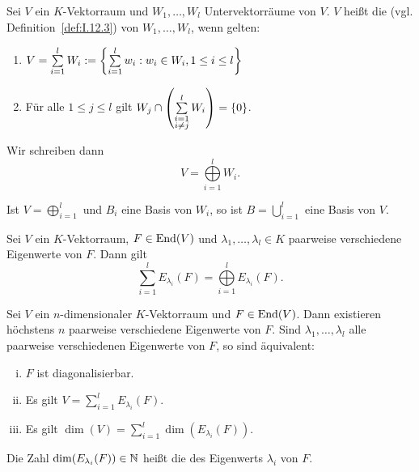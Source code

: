 \begin{definition}
	\label{def:I.16.17}
	Sei $V$ ein $K$-Vektorraum und $W_1,\dots,W_l$ Untervektorräume von $V$.
	$V$ heißt die  (vgl. Definition~\ref{def:I.12.3}) von $W_1,\dots,W_l$, wenn gelten:
	\begin{enumerate}[(1)]
		\item $V = \sum\limits_{i=1}^{l} W_i := \left\{\sum\limits_{i=1}^{l} w_i : w_i \in W_i, 1 \leq i \leq l\right\}$
		\item Für alle $1 \leq j \leq l$ gilt $W_j \cap \left(\sum\limits_{\substack{i = 1 \\ i \neq j}}^{l} W_i\right) = \{0\}$.
	\end{enumerate}
	Wir schreiben dann
	\[
		V = \bigoplus\limits_{i=1}^l W_i.
	\]
\end{definition}

\begin{lemma}
	\label{lemma:I.16.18}
	Ist $V = \bigoplus\limits_{i=1}^{l}$ und $B_i$ eine Basis von $W_i$, so ist $B = \bigcup\limits_{i=1}^{l}$ eine Basis von $V$.
\end{lemma}

\begin{satz}
	\label{satz:I.16.19}
	Sei $V$ ein $K$-Vektorraum, $F \in \operatorname{End}(V)$ und $\lambda_1,\dots,\lambda_l \in K$ paarweise verschiedene Eigenwerte von $F$.
	Dann gilt
	\[
		\sum\limits_{i=1}^l E_{\lambda_i}(F) = \bigoplus\limits_{i=1}^{l} E_{\lambda_i}(F).
	\]
\end{satz}

\begin{satz}
	\label{satz:I.16.20}
	Sei $V$ ein $n$-dimensionaler $K$-Vektorraum und $F \in \operatorname{End}(V)$.
	Dann existieren höchstens $n$ paarweise verschiedene Eigenwerte von $F$.
	Sind $\lambda_1,\dots,\lambda_l$ alle paarweise verschiedenen Eigenwerte von $F$, so sind äquivalent:
	\begin{enumerate}[(i)]
		\item $F$ ist diagonalisierbar.
		\item Es gilt $V = \sum\limits_{i=1}^{l} E_{\lambda_i}(F)$.
		\item Es gilt $\dim(V) = \sum\limits_{i=1}^l \dim(E_{\lambda_i}(F))$.
	\end{enumerate}
\end{satz}

\begin{definition}
	\label{def:I.16.21}
	Die Zahl $\dim(E_{\lambda_i}(F)) \in \mathbb{N}$ heißt die  des Eigenwerts $\lambda_i$ von $F$.
\end{definition}
\cleardoubleoddemptypage